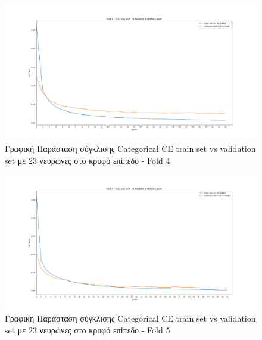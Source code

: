 \documentclass[12pt,a4paper]{article}
\begin{document}
\begin{figure}[H]
	\includegraphics[width=\textwidth]{22. Train vs Validation Fold 4.png}
	\caption{Γραφική Παράσταση σύγκλισης Categorical CE train set vs validation set με 23 νευρώνες στο κρυφό επίπεδο - Fold 4}
\end{figure}

\begin{figure}[H]
	\includegraphics[width=\textwidth]{23. Train vs Validation Fold 5.png}
	\caption{Γραφική Παράσταση σύγκλισης Categorical CE train set vs validation set με 23 νευρώνες στο κρυφό επίπεδο - Fold 5}
\end{figure}
\end{document}
